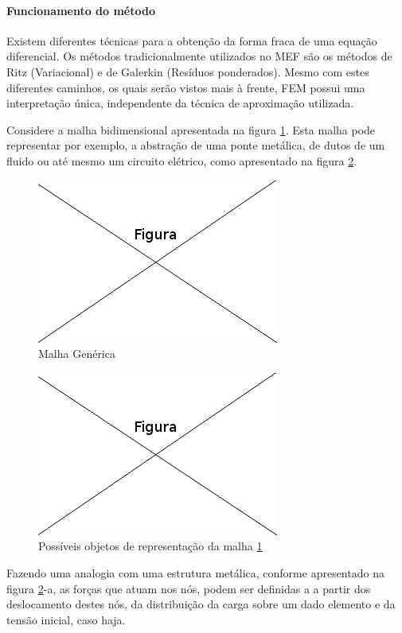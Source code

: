 \paragraph{Funcionamento do método \\}
Existem diferentes técnicas para a obtenção da forma fraca de uma equação diferencial. Os métodos tradicionalmente utilizados no MEF são os métodos de Ritz (Variacional) e de Galerkin (Resíduos ponderados). Mesmo com estes diferentes caminhos, os quais serão vistos mais à frente, FEM possui uma interpretação única, independente da  técnica de aproximação utilizada. 

Considere a malha bidimensional  apresentada na figura \ref{fig:malhaGenerica}. Esta malha pode representar por exemplo, a abstração de uma ponte metálica, de dutos de um fluido ou até mesmo um circuito elétrico, como apresentado na figura \ref{fig:repMalhaGenerica}.
\begin{figure}[!htb]
\centering
\includegraphics[scale=0.5]{figuras/temp.png}
\caption{Malha Genérica}
\label{fig:malhaGenerica}
\end{figure}

\begin{figure}[!htb]
\centering
\includegraphics[scale=0.5]{figuras/temp.png}
\caption{Possíveis objetos de representação da malha \ref{fig:malhaGenerica}}
\label{fig:repMalhaGenerica}
\end{figure}


 Fazendo uma analogia com uma estrutura metálica, conforme apresentado na figura \ref{fig:repMalhaGenerica}-a, as forças que atuam nos nós, podem ser definidas  a a partir dos deslocamento destes nós, da distribuição da carga sobre um dado elemento e da tensão inicial, caso haja.
 
